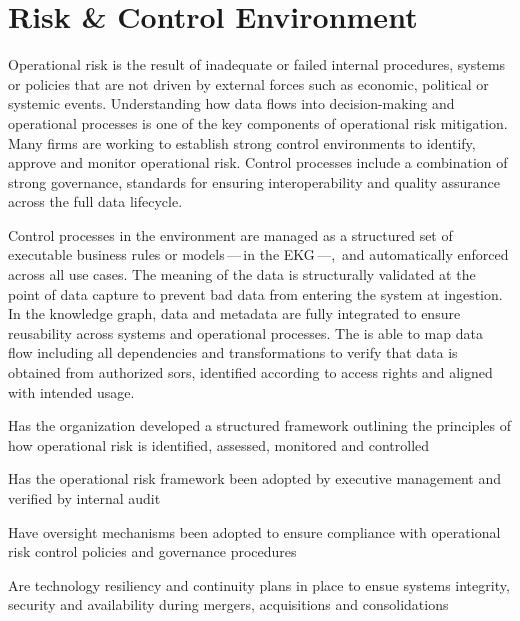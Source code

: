 \section{Risk \& Control Environment}\label{sec:ekg-mm-b-4-6} %

Operational risk is the result of inadequate or failed internal procedures,
systems or policies that are not driven by external forces such as economic, political or systemic events.
Understanding how data flows into decision-making and operational processes is one of the key components of
operational risk mitigation.
Many firms are working to establish strong control environments to identify, approve and monitor operational risk.
Control processes include a combination of strong governance, standards for ensuring interoperability and
quality assurance across the full data lifecycle.

\ekgmmContextSection

Control processes in the  environment are managed as a structured set of executable business rules
or models\,---\,in the EKG\,---,\ and automatically enforced across all use cases.
The meaning of the data is structurally validated at the point of data capture to prevent bad data from
entering the system at ingestion.
In the knowledge graph, data and metadata are fully integrated to ensure reusability across systems
and operational processes.
The  is able to map data flow including all dependencies and transformations to verify that
data is obtained from authorized \glspl{sor}, identified according to access rights and
aligned with intended usage.

\kgmmcorequestionssection

\begin{core-questions}

  \item [\thesection.1] Has the organization developed a structured framework outlining the principles of how
                        operational risk is identified, assessed, monitored and controlled
  \item [\thesection.2] Has the operational risk framework been adopted by executive management and verified by
                        internal audit
  \item [\thesection.3] Have oversight mechanisms been adopted to ensure compliance with operational risk
                        control policies and governance procedures
  \item [\thesection.4] Are technology resiliency and continuity plans in place to ensue systems integrity,
                        security and availability during mergers, acquisitions and consolidations

\end{core-questions}

